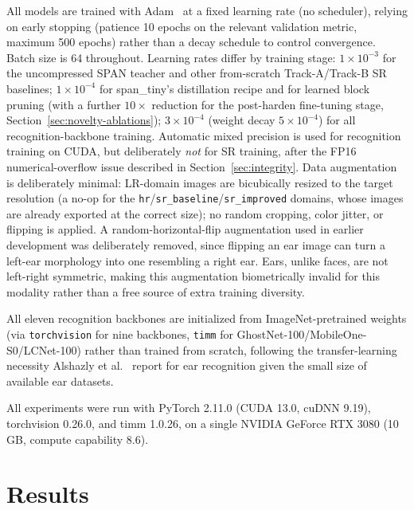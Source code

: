 \documentclass[11pt]{article}
\begin{document}
All models are trained with Adam~\cite{kingma2015adam} at a fixed learning rate (no scheduler), relying on early stopping (patience 10 epochs on the relevant validation metric, maximum 500 epochs) rather than a decay schedule to control convergence. Batch size is 64 throughout. Learning rates differ by training stage: $1\times10^{-3}$ for the uncompressed SPAN teacher and other from-scratch Track-A/Track-B SR baselines; $1\times10^{-4}$ for span\_tiny's distillation recipe and for learned block pruning (with a further $10\times$ reduction for the post-harden fine-tuning stage, Section~\ref{sec:novelty-ablations}); $3\times10^{-4}$ (weight decay $5\times10^{-4}$) for all recognition-backbone training. Automatic mixed precision is used for recognition training on CUDA, but deliberately \emph{not} for SR training, after the FP16 numerical-overflow issue described in Section~\ref{sec:integrity}. Data augmentation is deliberately minimal: LR-domain images are bicubically resized to the target resolution (a no-op for the \texttt{hr}/\texttt{sr\_baseline}/\texttt{sr\_improved} domains, whose images are already exported at the correct size); no random cropping, color jitter, or flipping is applied. A random-horizontal-flip augmentation used in earlier development was deliberately removed, since flipping an ear image can turn a left-ear morphology into one resembling a right ear. Ears, unlike faces, are not left-right symmetric, making this augmentation biometrically invalid for this modality rather than a free source of extra training diversity.

All eleven recognition backbones are initialized from ImageNet-pretrained weights (via \texttt{torchvision} for nine backbones, \texttt{timm} for GhostNet-100/MobileOne-S0/LCNet-100) rather than trained from scratch, following the transfer-learning necessity Alshazly et al.~\cite{alshazly2020unconstrained} report for ear recognition given the small size of available ear datasets.

All experiments were run with PyTorch 2.11.0 (CUDA 13.0, cuDNN 9.19), torchvision 0.26.0, and timm 1.0.26, on a single NVIDIA GeForce RTX 3080 (10\,GB, compute capability 8.6).

\section{Results}
\label{sec:results}
\end{document}
